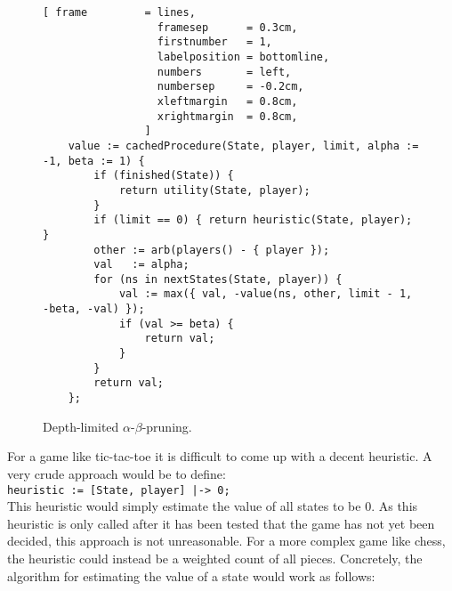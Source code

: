 \begin{figure}[!ht]
\centering
\begin{Verbatim}[ frame         = lines, 
                  framesep      = 0.3cm, 
                  firstnumber   = 1,
                  labelposition = bottomline,
                  numbers       = left,
                  numbersep     = -0.2cm,
                  xleftmargin   = 0.8cm,
                  xrightmargin  = 0.8cm,
                ]
    value := cachedProcedure(State, player, limit, alpha := -1, beta := 1) {
        if (finished(State)) {
            return utility(State, player);
        }
        if (limit == 0) { return heuristic(State, player); }
        other := arb(players() - { player });
        val   := alpha;
        for (ns in nextStates(State, player)) {
            val := max({ val, -value(ns, other, limit - 1, -beta, -val) });
            if (val >= beta) {
                return val;
            }
        }
        return val;
    };
\end{Verbatim}
\vspace*{-0.3cm}
\caption{Depth-limited $\alpha$-$\beta$-pruning.}
\label{fig:game-limit.stlx}
\end{figure}
For a game like tic-tac-toe it is difficult to come up with a decent heuristic.  A very crude approach would be
to define:
\\[0.2cm]
\hspace*{1.3cm}
\texttt{heuristic := [State, player] |-> 0;}
\\[0.2cm]
This heuristic would simply estimate the value of all states to be $0$.  As this heuristic is only called after
it has been tested that the game has not yet been decided, this approach is not unreasonable.  For a more
complex game like chess, the heuristic could instead be a weighted count of all pieces.  Concretely, the
algorithm for estimating the value of a state would work as follows:
